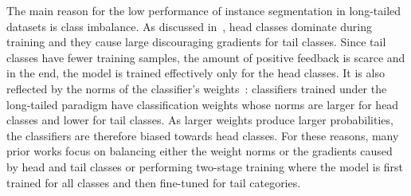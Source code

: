 \documentclass[runningheads]{llncs}
\begin{document}
The main reason for the low performance of instance segmentation in long-tailed datasets is class imbalance. As discussed in~\cite{tan2020equalization,wang2021seesaw,mahajan2018exploring}, head classes dominate during training and they cause large discouraging gradients for tail classes. Since tail classes have fewer training samples, the amount of positive feedback is scarce and in the end, the model is trained effectively only for the head classes. It is also reflected by the norms of the classifier's weights~\cite{kang2019decoupling}: classifiers trained under the long-tailed paradigm have classification weights whose norms are larger for head classes and lower for tail classes. As larger weights produce larger probabilities, the classifiers are therefore biased towards head classes. For these reasons, many prior works focus on balancing either the weight norms or the gradients caused by head and tail classes or performing two-stage training where the model is first trained for all classes and then fine-tuned for tail categories. 
\end{document}
